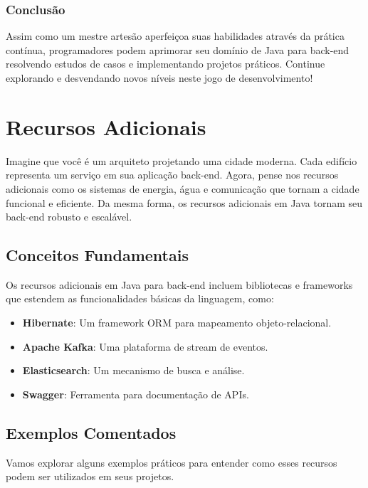 \documentclass[a4paper,12pt]{book}
\begin{document}
\subsection{Conclusão}
Assim como um mestre artesão aperfeiçoa suas habilidades através da prática contínua, programadores podem aprimorar seu domínio de Java para back-end resolvendo estudos de casos e implementando projetos práticos. Continue explorando e desvendando novos níveis neste jogo de desenvolvimento!


\chapter{Recursos Adicionais}
Imagine que você é um arquiteto projetando uma cidade moderna. Cada edifício representa um serviço em sua aplicação back-end. Agora, pense nos recursos adicionais como os sistemas de energia, água e comunicação que tornam a cidade funcional e eficiente. Da mesma forma, os recursos adicionais em Java tornam seu back-end robusto e escalável.

\section{Conceitos Fundamentais}
Os recursos adicionais em Java para back-end incluem bibliotecas e frameworks que estendem as funcionalidades básicas da linguagem, como:
\begin{itemize}
  \item \textbf{Hibernate}: Um framework ORM para mapeamento objeto-relacional.
  \item \textbf{Apache Kafka}: Uma plataforma de stream de eventos.
  \item \textbf{Elasticsearch}: Um mecanismo de busca e análise.
  \item \textbf{Swagger}: Ferramenta para documentação de APIs.
\end{itemize}

\section{Exemplos Comentados}
Vamos explorar alguns exemplos práticos para entender como esses recursos podem ser utilizados em seus projetos.
\end{document}
